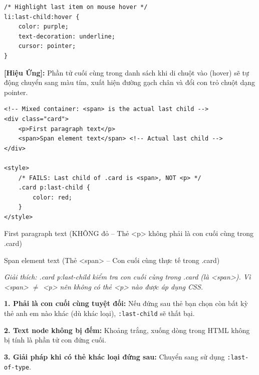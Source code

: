 \documentclass[11pt,oneside]{book}
\newcommand{\codeinline}[1]{\textcolor{accentOrange}{\texttt{#1}}}
\begin{document}
\begin{codeWindow}
\begin{lstlisting}[language=CSS3]
/* Highlight last item on mouse hover */
li:last-child:hover {
    color: purple;
    text-decoration: underline;
    cursor: pointer;
}
\end{lstlisting}
\end{codeWindow}

\begin{tipBox}
\textbf{[Hiệu Ứng]:} Phần tử cuối cùng trong danh sách khi di chuột vào (hover) sẽ tự động chuyển sang màu tím, xuất hiện đường gạch chân và đổi con trỏ chuột dạng pointer.
\end{tipBox}

\begin{codeWindow}
\begin{lstlisting}[language=HTML5]
<!-- Mixed container: <span> is the actual last child -->
<div class="card">
    <p>First paragraph text</p>
    <span>Span element text</span> <!-- Actual last child -->
</div>

<style>
    /* FAILS: Last child of .card is <span>, NOT <p> */
    .card p:last-child {
        color: red;
    }
</style>
\end{lstlisting}
\end{codeWindow}

\begin{browserWindow}
\sffamily\small
First paragraph text {\scriptsize\textcolor{gray!60}{(KHÔNG đỏ -- Thẻ <p> không phải là con cuối cùng trong .card)}} \par\vspace{2pt}
Span element text {\scriptsize\textcolor{gray!60}{(Thẻ <span> -- Con cuối cùng thực tế trong .card)}} \par\vspace{4pt}
{\scriptsize\textcolor{gray!60}{\textit{Giải thích: .card p:last-child kiểm tra con cuối cùng trong .card (là <span>). Vì <span> $\neq$ <p> nên không có thẻ <p> nào được áp dụng CSS.}}}
\end{browserWindow}

\begin{warnBox}
\textbf{1. Phải là con cuối cùng tuyệt đối:} Nếu đứng sau thẻ bạn chọn còn bất kỳ thẻ anh em nào khác (dù khác loại), \codeinline{:last-child} sẽ thất bại.
\par\vspace{4pt}
\textbf{2. Text node không bị đếm:} Khoảng trắng, xuống dòng trong HTML không bị tính là phần tử con đứng cuối.
\par\vspace{4pt}
\textbf{3. Giải pháp khi có thẻ khác loại đứng sau:} Chuyển sang sử dụng \codeinline{:last-of-type}.
\end{warnBox}
\end{document}

